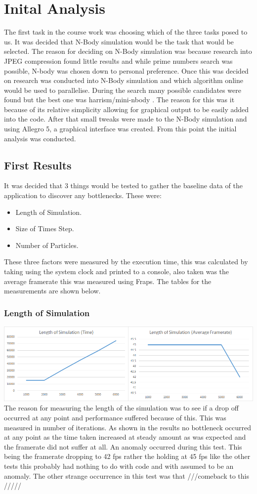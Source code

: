 \documentclass[12pt]{article}
\begin{document}
\section{Inital Analysis}
The first task in the course work was choosing which of the three tasks posed to us. It was decided that N-Body simulation would be the task that would be selected. The reason for deciding on N-Body simulation was because research into JPEG compression found little results and while prime numbers search was possible, N-body was chosen down to personal preference.
\newline 
Once this was decided on research was conducted into N-Body simulation and which algorithm online would be used to parallelise. During the search many possible candidates were found but the best one was harrism/mini-nbody . The reason for this was it because of its relative simplicity allowing for graphical output to be easily added into the code. After that small tweaks were made to the N-Body simulation and using Allegro 5, a graphical interface was created. From this point the initial analysis was conducted.
\subsection{First Results}
It was decided that 3 things would be tested to gather the baseline data of the application to discover any bottlenecks. These were:
\begin{itemize}
 \item Length of Simulation.
 \item Size of Times Step.
  \item Number of Particles. 
\end{itemize}
These three factors were measured by the execution time, this was calculated by taking using the system clock and printed to a console, also taken was the average framerate this was measured using Fraps. The tables for the measurements are shown below.
\subsubsection{Length of Simulation}
\includegraphics[scale=0.5]{pics/ialength.png}
\newline
The reason for measuring the length of the simulation was to see if a drop off occurred at any point and performance suffered because of this. This was measured in number of iterations. As shown in the results no bottleneck occurred at any point as the time taken increased at steady amount as was expected and the framerate did not suffer at all. An anomaly occurred during this test. This being the framerate dropping to 42 fps rather the holding at 45 fps like the other tests this probably had nothing to do with code and with assumed to be an anomaly. The other strange occurrence in this test was that ///comeback to this /////
\end{document}
